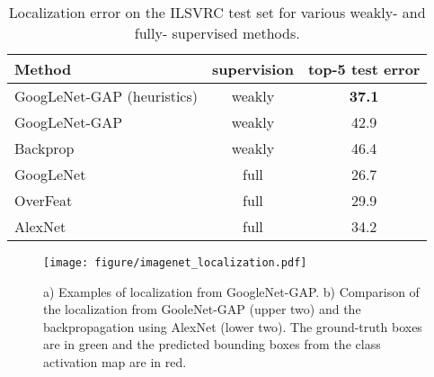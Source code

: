 \documentclass[10pt,twocolumn,letterpaper]{article}
\begin{document}
\begin{table}\caption{Localization error on the ILSVRC test set for various weakly- and fully- supervised methods.}\label{networktestset}
\centering
\footnotesize
\begin{tabular}{ l | c | c  }
  \hline  
  \hline                       
  Method & supervision &  top-5 test error \\
    \hline  
  GoogLeNet-GAP (heuristics)  & weakly & \textbf{37.1} \\     
  GoogLeNet-GAP  & weakly & 42.9 \\ 
  Backprop \cite{simonyan2013deep} & weakly & 46.4 \\
      \hline 
  GoogLeNet \cite{szegedy2014going} & full & 26.7 \\
  OverFeat \cite{sermanet2013overfeat} & full & 29.9 \\        
  AlexNet \cite{szegedy2014going} & full & 34.2 \\
  \hline  
\end{tabular}
\end{table}

\begin{figure*}
\begin{center}
\texttt{[image: figure/imagenet\_localization.pdf]}
\end{center}
\caption{a) Examples of localization from GoogleNet-GAP. b) Comparison of the localization from GooleNet-GAP (upper two) and the backpropagation using AlexNet (lower two). The ground-truth boxes are in green and the predicted bounding boxes from the class activation map are in red.}
\label{fig:localizationexample}
\end{figure*}
\end{document}
